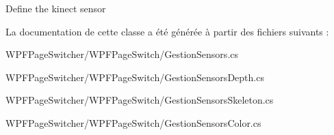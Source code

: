 Define the kinect sensor 



La documentation de cette classe a été générée à partir des fichiers suivants \+:\begin{DoxyCompactItemize}
\item 
W\+P\+F\+Page\+Switcher/\+W\+P\+F\+Page\+Switch/Gestion\+Sensors.\+cs\item 
W\+P\+F\+Page\+Switcher/\+W\+P\+F\+Page\+Switch/Gestion\+Sensors\+Depth.\+cs\item 
W\+P\+F\+Page\+Switcher/\+W\+P\+F\+Page\+Switch/Gestion\+Sensors\+Skeleton.\+cs\item 
W\+P\+F\+Page\+Switcher/\+W\+P\+F\+Page\+Switch/Gestion\+Sensors\+Color.\+cs\end{DoxyCompactItemize}
